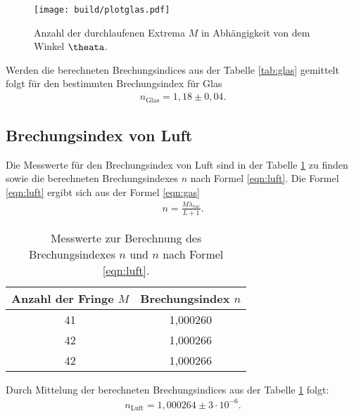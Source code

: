 \begin{figure}
    \centering
    \texttt{[image: build/plotglas.pdf]}
    \caption{Anzahl der durchlaufenen Extrema $M$ in Abhängigkeit von dem Winkel $\theata$.}
    \label{fig:glas}
\end{figure}


Werden die berechneten Brechungsindices aus der Tabelle \ref{tab:glas} gemittelt folgt für den
bestimmten Brechungsindex für Glas
\begin{align*}
  n_\mathrm{Glas}=1,18\pm0,04.
\end{align*}


\subsection{Brechungsindex von Luft}
Die Messwerte für den Brechungsindex von Luft sind in der Tabelle \ref{tab:luft}
zu finden sowie die berechneten Brechungsindexes $n$ nach Formel \eqref{eqn:luft}.
Die Formel \eqref{eqn:luft} ergibt sich aus der Formel \eqref{eqn:gas}
\begin{align}%
    n=\frac{M\lambda_\mathrm{vac}}{L+1} \label{eqn:luft}.
\end{align}

\begin{table}
\centering
\caption{Messwerte zur Berechnung des Brechungsindexes $n$ und $n$ nach Formel \eqref{eqn:luft}.}
\label{tab:luft}
\begin{tabular}{c c}
\toprule
  Anzahl der Fringe $M$ & Brechungsindex $n$ \\
\midrule
41 &  1,000260\\
42 &  1,000266\\
42 &  1,000266\\
\bottomrule
\end{tabular}
\end{table}
Durch Mittelung der berechneten Brechungsindices aus der Tabelle \ref{tab:luft}
folgt:
\begin{align*}
  n_\mathrm{Luft}=1,000264\pm 3\cdot10^{-6}.
\end{align*}
